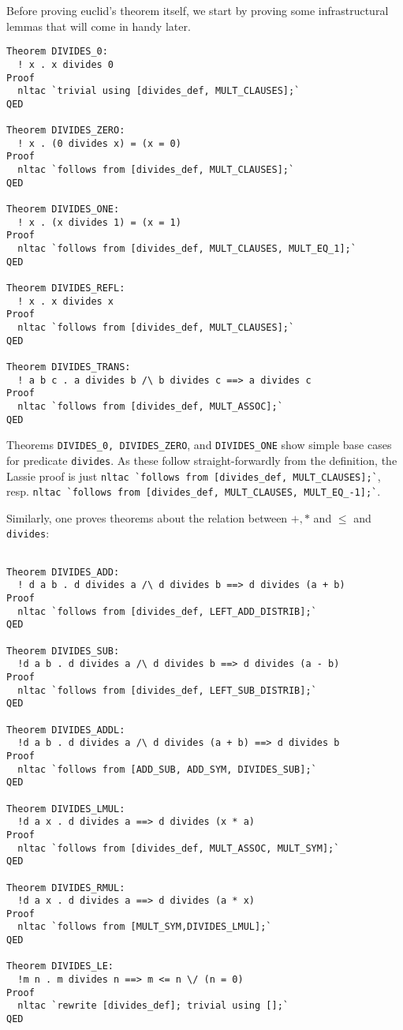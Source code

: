 Before proving euclid's theorem itself, we start by proving some infrastructural
lemmas that will come in handy later.
\begin{lstlisting}
Theorem DIVIDES_0:
  ! x . x divides 0
Proof
  nltac `trivial using [divides_def, MULT_CLAUSES];`
QED

Theorem DIVIDES_ZERO:
  ! x . (0 divides x) = (x = 0)
Proof
  nltac `follows from [divides_def, MULT_CLAUSES];`
QED

Theorem DIVIDES_ONE:
  ! x . (x divides 1) = (x = 1)
Proof
  nltac `follows from [divides_def, MULT_CLAUSES, MULT_EQ_1];`
QED

Theorem DIVIDES_REFL:
  ! x . x divides x
Proof
  nltac `follows from [divides_def, MULT_CLAUSES];`
QED

Theorem DIVIDES_TRANS:
  ! a b c . a divides b /\ b divides c ==> a divides c
Proof
  nltac `follows from [divides_def, MULT_ASSOC];`
QED
\end{lstlisting}

Theorems \lstinline{DIVIDES_0, DIVIDES_ZERO}, and \lstinline{DIVIDES_ONE} show
simple base cases for predicate \lstinline{divides}.
As these follow straight-forwardly from the definition, the Lassie proof is just
\lstinline{nltac `follows from [divides_def, MULT_CLAUSES];`}, resp.
\lstinline{nltac `follows from [divides_def, MULT_CLAUSES, MULT_EQ_-1];`}.

Similarly, one proves theorems about the relation between $+, *$ and $\leq$ and
\lstinline{divides}:
\begin{lstlisting}

Theorem DIVIDES_ADD:
  ! d a b . d divides a /\ d divides b ==> d divides (a + b)
Proof
  nltac `follows from [divides_def, LEFT_ADD_DISTRIB];`
QED

Theorem DIVIDES_SUB:
  !d a b . d divides a /\ d divides b ==> d divides (a - b)
Proof
  nltac `follows from [divides_def, LEFT_SUB_DISTRIB];`
QED

Theorem DIVIDES_ADDL:
  !d a b . d divides a /\ d divides (a + b) ==> d divides b
Proof
  nltac `follows from [ADD_SUB, ADD_SYM, DIVIDES_SUB];`
QED

Theorem DIVIDES_LMUL:
  !d a x . d divides a ==> d divides (x * a)
Proof
  nltac `follows from [divides_def, MULT_ASSOC, MULT_SYM];`
QED

Theorem DIVIDES_RMUL:
  !d a x . d divides a ==> d divides (a * x)
Proof
  nltac `follows from [MULT_SYM,DIVIDES_LMUL];`
QED

Theorem DIVIDES_LE:
  !m n . m divides n ==> m <= n \/ (n = 0)
Proof
  nltac `rewrite [divides_def]; trivial using [];`
QED
\end{lstlisting}

